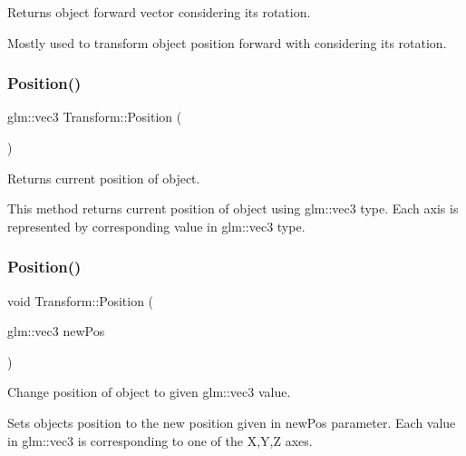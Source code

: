 Returns object forward vector considering it\textquotesingle{}s rotation. 

Mostly used to transform object position forward with considering it\textquotesingle{}s rotation. \mbox{\label{class_transform_ab3aa7217c2b53146ae0ec4a4eddf3ba0}} 
\subsubsection{\texorpdfstring{Position()}{Position()}\hspace{0.1cm}{\footnotesize\ttfamily [1/3]}}
{\footnotesize\ttfamily glm\+::vec3 Transform\+::\+Position (\begin{DoxyParamCaption}{ }\end{DoxyParamCaption})\hspace{0.3cm}{\ttfamily [inline]}}



Returns current position of object. 

This method returns current position of object using glm\+::vec3 type. Each axis is represented by corresponding value in glm\+::vec3 type. \mbox{\label{class_transform_a1f5f28293a7e54f8330f4090ea38b9f7}} 
\subsubsection{\texorpdfstring{Position()}{Position()}\hspace{0.1cm}{\footnotesize\ttfamily [2/3]}}
{\footnotesize\ttfamily void Transform\+::\+Position (\begin{DoxyParamCaption}\item[{glm\+::vec3}]{new\+Pos }\end{DoxyParamCaption})\hspace{0.3cm}{\ttfamily [inline]}}



Change position of object to given glm\+::vec3 value. 

Sets object\textquotesingle{}s position to the new position given in new\+Pos parameter. Each value in glm\+::vec3 is corresponding to one of the X,Y,Z axes. \mbox{\label{class_transform_a8d24b66e54f0489c03389a6424f0bb21}} 
